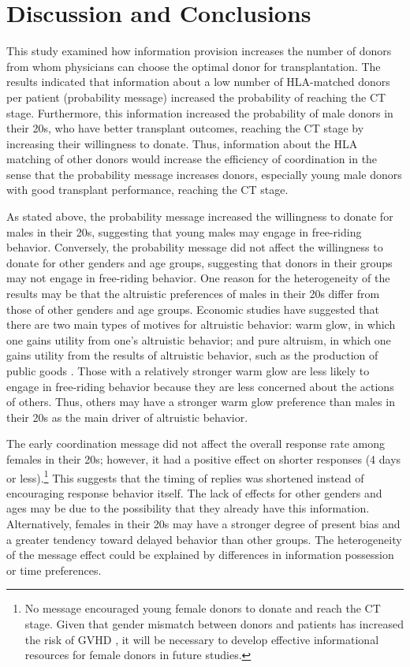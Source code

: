 \documentclass [12pt, a4paper]{article}
\begin{document}
\hypertarget{conclusion}{%
\section{Discussion and Conclusions}\label{conclusion}}

This study examined how information provision increases the number  of donors from whom physicians can choose the optimal donor for transplantation. The results indicated that information about a low number of HLA-matched donors per patient (probability message) increased the probability of reaching the CT stage. Furthermore, this information increased the probability of male donors in their 20s, who have better transplant outcomes, reaching the CT stage by increasing their willingness to donate. Thus, information about the HLA matching of other donors would increase the efficiency of coordination in the sense that the probability message increases donors, especially young male donors with good transplant performance, reaching the CT stage.

As stated above, the probability message increased the willingness to donate for males in their 20s, suggesting that young males may engage in free-riding behavior. Conversely, the probability message did not affect the willingness to donate for other genders and age groups, suggesting that donors in their groups  may not engage in free-riding behavior. One reason for the heterogeneity of the results may be that the altruistic preferences of males in their 20s differ from those of other genders and age groups. Economic studies have suggested that there are two main types of motives for altruistic behavior: warm glow, in which one gains utility from one's altruistic behavior; and pure altruism, in which one gains utility from the results of altruistic behavior, such as the production of public goods \citep[e.g.,][]{Andreoni1990}. Those with a relatively stronger warm glow are less likely to engage in free-riding behavior because they are less concerned about the actions of others. Thus, others may have a stronger warm glow preference than males in their 20s as the main driver of altruistic behavior.

The early coordination message did not affect  the overall response rate among females in their 20s; however, it had a positive effect on shorter responses (4 days or less).\footnote{No message encouraged young female donors to donate and reach the CT stage. Given that gender mismatch between donors and patients has increased the risk of GVHD \citep{Loren2006, Nannya2011}, it will be necessary to develop effective informational resources for female donors in future studies.} This suggests that the timing of replies was shortened instead of encouraging response behavior itself. The lack of effects for other genders and ages may be due to the possibility that they already have this information. Alternatively, females in their 20s may have a stronger degree of present bias and a greater tendency toward delayed behavior than other groups. The heterogeneity of the message effect could be explained by differences in information possession or time preferences.
\end{document}
